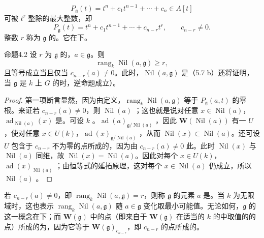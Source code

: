 \[P_{\mathfrak g}(t)=t^n+c_1t^{n-1}+\cdots+c_n\in A[t]\]
可被 $t^r$ 整除的最大整数，即
\[P_{\mathfrak g}(t)=t^n+c_1t^{n-1}+\cdots+c_{n-r}t^r,\qquad c_{n-r}\ne0.\]
整数 $r$ 称为 $\mathfrak g$ 的。它在下。
\begin{SGAresult}{命题}{4.2}
设 $r$ 为 $\mathfrak g$ 的，$a\in\mathfrak g$。则
\[\operatorname{rang}_k\operatorname{Nil}(a,\mathfrak g)\geq r,\]
且等号成立当且仅当 $c_{n-r}(a)\ne0$。此时，$\operatorname{Nil}(a,\mathfrak g)$ 是（5.7 b）还将证明，当 $\mathfrak g$ 是 $k$ 上 $G$ 的时，逆命题成立）。
\end{SGAresult}
\begin{proof}
第一项断言显然，因为由定义，$\operatorname{rang}_k\operatorname{Nil}(a,\mathfrak g)$ 等于 $P_{\mathfrak g}(a,t)$ 的零根。来证若 $c_{n-r}(a)\ne0$，则 $\operatorname{Nil}(a)$ ；这也就是说对任意 $x\in\operatorname{Nil}(a)$，$\operatorname{ad}_{\operatorname{Nil}(a)}(x)$ 是。可设 $k$ 。$\operatorname{ad}(a)_{\mathfrak g/\operatorname{Nil}(a)}$ ，因此 $\mathbf W(\operatorname{Nil}(a))$ 有一 $U$，使对任意 $x\in U(k)$，$\operatorname{ad}(x)_{\mathfrak g/\operatorname{Nil}(a)}$ ，从而 $\operatorname{Nil}(x)\subset\operatorname{Nil}(a)$。还可设 $U$ 包含于 $c_{n-r}$ 不为零的点所成的，因为由 $c_{n-r}(a)\ne0$ 此。此时 $\operatorname{Nil}(x)$ 与 $\operatorname{Nil}(a)$ 同维，故 $\operatorname{Nil}(x)=\operatorname{Nil}(a)$。因此对每个 $x\in U(k)$，$\operatorname{ad}(x)_{\operatorname{Nil}(a)}$ ；由恒等式的延拓原理，这对每个 $x\in\operatorname{Nil}(a)$ 仍成立，所以 $\operatorname{Nil}(a)$ 。
\end{proof}
若 $c_{n-r}(a)\ne0$，即 $\operatorname{rang}_k\operatorname{Nil}(a,\mathfrak g)=r$，则称 $\mathfrak g$ 的元素 $a$ 是。当 $k$ 为无限域时，这也表示 $\operatorname{rang}_k\operatorname{Nil}(a,\mathfrak g)$ 随 $a\in\mathfrak g$ 变化取最小可能值。无论如何，$\mathfrak g$ 的这一概念在下；而 $\mathbf W(\mathfrak g)$ 中的点（即来自于 $\mathbf W(\mathfrak g)$ 在适当的 $k$ 的中取值的的点）所成的为，因为它等于 $\mathbf W(\mathfrak g)_{c_{n-r}}$，即 $c_{n-r}$ 的点所成的。

